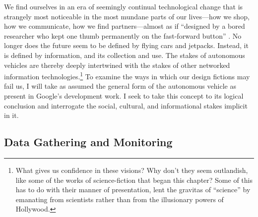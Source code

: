 We find ourselves in an era of seemingly continual technological
change that is strangely most noticeable in the most mundane parts of
our lives---how we shop, how we communicate, how we find
partners---almost as if ``designed by a bored researcher who kept one
thumb permanently on the fast-forward button'' \cite[p.
  7]{Neuromancer1984}. No longer does the future seem to be
defined by flying cars and jetpacks. Instead, it is defined by
information, and its collection and use. The stakes of autonomous
vehicles are thereby deeply intertwined with the
stakes of other networked information technologies.\footnote{What gives us confidence in
these visions? Why don't they seem 
outlandish, like some of the works of science-fiction that began this
chapter? Some of this has to do with their manner of 
presentation, lent the gravitas of ``science'' by emanating from
scientists rather than from the
illusionary powers of Hollywood.} To examine the
ways in which our design fictions may fail us, I will
take as assumed the general form of the autonomous vehicle as present
in Google's development work. I seek to take this concept
to its logical conclusion and interrogate the social,
cultural, and informational stakes implicit in it. 


\subsection{Data Gathering and Monitoring} 



